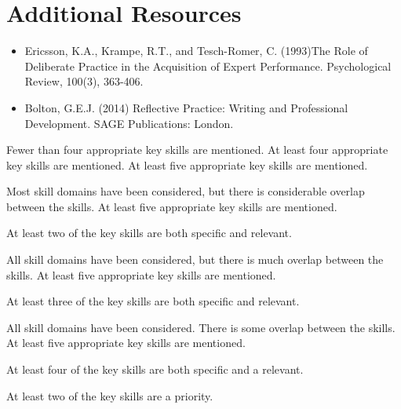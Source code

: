 \documentclass{../fal_assignment}
\begin{document}
\section*{Additional Resources}

\begin{itemize}
    \item Ericsson, K.A., Krampe, R.T., and Tesch-Romer, C. (1993)The Role of Deliberate Practice in the Acquisition of Expert Performance. Psychological Review, 100(3), 363-406.
    \item Bolton, G.E.J. (2014) Reflective Practice: Writing and Professional Development. SAGE Publications: London.
\end{itemize}

\begin{markingrubric}
%
%
        \grade\fail 	Fewer than four appropriate key skills are mentioned.
        \grade 		At least four appropriate key skills are mentioned.
        \grade 		At least five appropriate key skills are mentioned.
        \par 		Most skill domains have been considered, but there is considerable overlap between the skills.
        \grade 		At least five appropriate key skills are mentioned.
        \par 		At least two of the key skills are both specific and relevant.
        \par 		All skill domains have been considered, but there is much overlap between the skills.
        \grade 		At least five appropriate key skills are mentioned.
        \par 		At least three of the key skills are both specific and relevant.
        \par 		All skill domains have been considered. There is some overlap between the skills.
        \grade 		At least five appropriate key skills are mentioned.
        \par 		At least four of the key skills are both specific and a relevant.
        \par 		At least two of the key skills are a priority.

\end{markingrubric}
\end{document}
